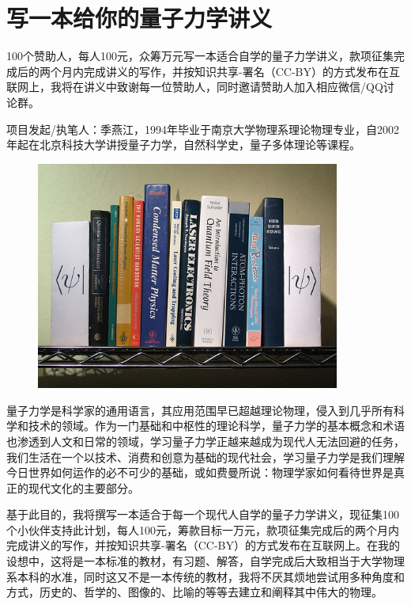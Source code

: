 \section{写一本给你的量子力学讲义}

100个赞助人，每人100元，众筹万元写一本适合自学的量子力学讲义，款项征集完成后的两个月内完成讲义的写作，并按知识共享-署名（CC-BY）的方式发布在互联网上，我将在讲义中致谢每一位赞助人，同时邀请赞助人加入相应微信/QQ讨论群。

项目发起/执笔人：季燕江，1994年毕业于南京大学物理系理论物理专业，自2002年起在北京科技大学讲授量子力学，自然科学史，量子多体理论等课程。

\begin{figure}[htbp]
\begin{center}
\includegraphics[width=10cm]{Appendix/qmbooks.jpg}
\end{center}
\end{figure}

量子力学是科学家的通用语言，其应用范围早已超越理论物理，侵入到几乎所有科学和技术的领域。作为一门基础和中枢性的理论科学，量子力学的基本概念和术语也渗透到人文和日常的领域，学习量子力学正越来越成为现代人无法回避的任务，我们生活在一个以技术、消费和创意为基础的现代社会，学习量子力学是我们理解今日世界如何运作的必不可少的基础，或如费曼所说：物理学家如何看待世界是真正的现代文化的主要部分。

基于此目的，我将撰写一本适合于每一个现代人自学的量子力学讲义，现征集100个小伙伴支持此计划，每人100元，筹款目标一万元，款项征集完成后的两个月内完成讲义的写作，并按知识共享-署名（CC-BY）的方式发布在互联网上。在我的设想中，这将是一本标准的教材，有习题、解答，自学完成后大致相当于大学物理系本科的水准，同时这又不是一本传统的教材，我将不厌其烦地尝试用多种角度和方式，历史的、哲学的、图像的、比喻的等等去建立和阐释其中伟大的物理。


